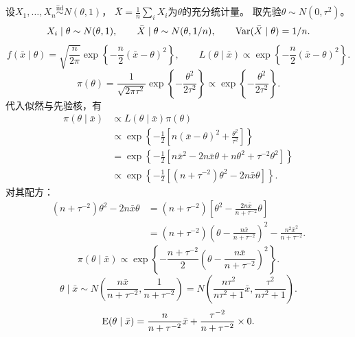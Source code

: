 设$X_1,\ldots,X_n\overset{\mathrm{iid}}{\sim}N(\theta,1)$，
$\bar X=\frac1n\sum_iX_i$为$\theta$的充分统计量。
取先验$\theta\sim N(0,\tau^2)$。
\[
X_i\mid\theta\sim N(\theta,1),\qquad
\bar X\mid\theta\sim N(\theta,1/n),\qquad
\operatorname{Var}(\bar X\mid\theta)=1/n.
\]
\[
f(\bar x\mid\theta)=\sqrt{\frac n{2\pi}}
\exp\left\{-\frac n2(\bar x-\theta)^2\right\},\qquad
L(\theta\mid\bar x)\propto
\exp\left\{-\frac n2(\bar x-\theta)^2\right\}.
\]
\[
\pi(\theta)=\frac1{\sqrt{2\pi\tau^2}}
\exp\left\{-\frac{\theta^2}{2\tau^2}\right\}
\propto\exp\left\{-\frac{\theta^2}{2\tau^2}\right\}.
\]
代入似然与先验核，有
\begin{align*}
\pi(\theta\mid\bar x)
&\propto L(\theta\mid\bar x)\pi(\theta)\\
&\propto\exp\left\{-\frac12
\left[n(\bar x-\theta)^2+\frac{\theta^2}{\tau^2}\right]\right\}\\
&=\exp\left\{-\frac12
\left[n\bar x^2-2n\bar x\theta+n\theta^2+\tau^{-2}\theta^2\right]\right\}\\
&\propto\exp\left\{-\frac12[(n+\tau^{-2})\theta^2-2n\bar x\theta]\right\}.
\end{align*}
对其配方：
\begin{align*}
(n+\tau^{-2})\theta^2-2n\bar x\theta
&=(n+\tau^{-2})\left[\theta^2-\frac{2n\bar x}{n+\tau^{-2}}\theta\right]\\
&=(n+\tau^{-2})\left(\theta-\frac{n\bar x}{n+\tau^{-2}}\right)^2
-\frac{n^2\bar x^2}{n+\tau^{-2}}.
\end{align*}
\[
\pi(\theta\mid\bar x)\propto
\exp\left\{-\frac{n+\tau^{-2}}2
\left(\theta-\frac{n\bar x}{n+\tau^{-2}}\right)^2\right\}.
\]
\[
\theta\mid\bar x\sim
N\left(\frac{n\bar x}{n+\tau^{-2}},\frac1{n+\tau^{-2}}\right)
=N\left(\frac{n\tau^2}{n\tau^2+1}\bar x,\frac{\tau^2}{n\tau^2+1}\right).
\]
\[
\operatorname{E}(\theta\mid\bar x)=
\frac n{n+\tau^{-2}}\bar x+\frac{\tau^{-2}}{n+\tau^{-2}}\times0.
\]
